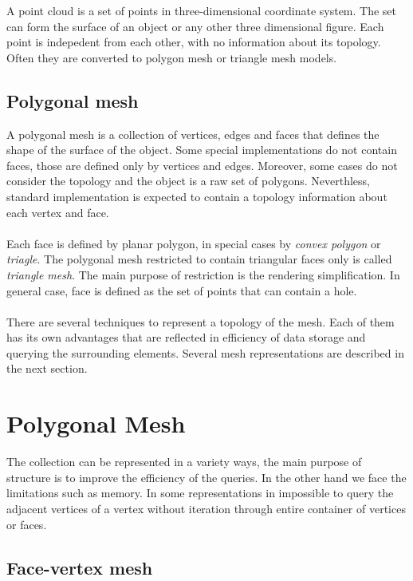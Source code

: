 A point cloud is a set of points in three-dimensional coordinate system. The set can form the surface
of an object or any other three dimensional figure. Each point is indepedent
from each other, with no information about its topology. Often they are converted to polygon mesh
or triangle mesh models.

\subsection{Polygonal mesh}

A polygonal mesh is a collection of vertices, edges and faces that defines the shape of the surface of
the object. Some special implementations do not contain faces, those are defined only by vertices and
edges. Moreover, some cases do not consider the topology and the object is a raw set of polygons.
Neverthless, standard implementation is expected to contain a topology information about each vertex
and face.
\\
\\
Each face is defined by planar polygon, in special cases by \emph{convex polygon} or \emph{triagle}.
The polygonal mesh restricted to contain triangular faces only is called \emph{triangle mesh}.
The main purpose of restriction is the rendering simplification. In general case, face is defined
as the set of points that can contain a hole.
\\
\\
There are several techniques to represent a topology of the mesh. Each of them has its own advantages
that are reflected in efficiency of data storage and querying the surrounding elements. Several
mesh representations are described in the next section.

\section{Polygonal Mesh}

The collection can be represented in a variety ways, the main purpose of structure is to improve
the efficiency of the queries. In the other hand we face the limitations such as memory. In some
representations in impossible to query the adjacent vertices of a vertex without iteration through
entire container of vertices or faces.

\subsection{Face-vertex mesh}

